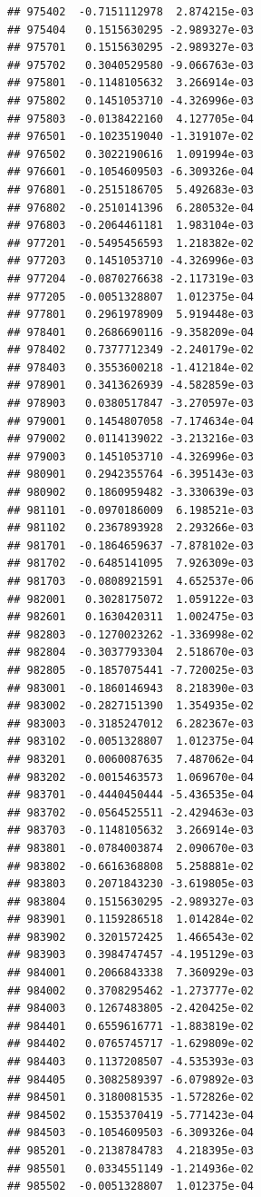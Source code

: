 \documentclass[ignorenonframetext,]{beamer}
\begin{document}
\begin{frame}[fragile]
\begin{verbatim}
## 975402  -0.7151112978  2.874215e-03
## 975404   0.1515630295 -2.989327e-03
## 975701   0.1515630295 -2.989327e-03
## 975702   0.3040529580 -9.066763e-03
## 975801  -0.1148105632  3.266914e-03
## 975802   0.1451053710 -4.326996e-03
## 975803  -0.0138422160  4.127705e-04
## 976501  -0.1023519040 -1.319107e-02
## 976502   0.3022190616  1.091994e-03
## 976601  -0.1054609503 -6.309326e-04
## 976801  -0.2515186705  5.492683e-03
## 976802  -0.2510141396  6.280532e-04
## 976803  -0.2064461181  1.983104e-03
## 977201  -0.5495456593  1.218382e-02
## 977203   0.1451053710 -4.326996e-03
## 977204  -0.0870276638 -2.117319e-03
## 977205  -0.0051328807  1.012375e-04
## 977801   0.2961978909  5.919448e-03
## 978401   0.2686690116 -9.358209e-04
## 978402   0.7377712349 -2.240179e-02
## 978403   0.3553600218 -1.412184e-02
## 978901   0.3413626939 -4.582859e-03
## 978903   0.0380517847 -3.270597e-03
## 979001   0.1454807058 -7.174634e-04
## 979002   0.0114139022 -3.213216e-03
## 979003   0.1451053710 -4.326996e-03
## 980901   0.2942355764 -6.395143e-03
## 980902   0.1860959482 -3.330639e-03
## 981101  -0.0970186009  6.198521e-03
## 981102   0.2367893928  2.293266e-03
## 981701  -0.1864659637 -7.878102e-03
## 981702  -0.6485141095  7.926309e-03
## 981703  -0.0808921591  4.652537e-06
## 982001   0.3028175072  1.059122e-03
## 982601   0.1630420311  1.002475e-03
## 982803  -0.1270023262 -1.336998e-02
## 982804  -0.3037793304  2.518670e-03
## 982805  -0.1857075441 -7.720025e-03
## 983001  -0.1860146943  8.218390e-03
## 983002  -0.2827151390  1.354935e-02
## 983003  -0.3185247012  6.282367e-03
## 983102  -0.0051328807  1.012375e-04
## 983201   0.0060087635  7.487062e-04
## 983202  -0.0015463573  1.069670e-04
## 983701  -0.4440450444 -5.436535e-04
## 983702  -0.0564525511 -2.429463e-03
## 983703  -0.1148105632  3.266914e-03
## 983801  -0.0784003874  2.090670e-03
## 983802  -0.6616368808  5.258881e-02
## 983803   0.2071843230 -3.619805e-03
## 983804   0.1515630295 -2.989327e-03
## 983901   0.1159286518  1.014284e-02
## 983902   0.3201572425  1.466543e-02
## 983903   0.3984747457 -4.195129e-03
## 984001   0.2066843338  7.360929e-03
## 984002   0.3708295462 -1.273777e-02
## 984003   0.1267483805 -2.420425e-02
## 984401   0.6559616771 -1.883819e-02
## 984402   0.0765745717 -1.629809e-02
## 984403   0.1137208507 -4.535393e-03
## 984405   0.3082589397 -6.079892e-03
## 984501   0.3180081535 -1.572826e-02
## 984502   0.1535370419 -5.771423e-04
## 984503  -0.1054609503 -6.309326e-04
## 985201  -0.2138784783  4.218395e-03
## 985501   0.0334551149 -1.214936e-02
## 985502  -0.0051328807  1.012375e-04

\end{verbatim}
\end{frame}
\end{document}
